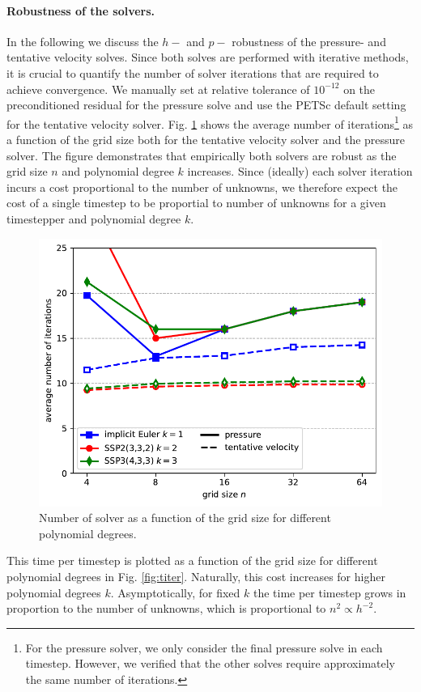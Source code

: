 \documentclass[11pt]{article}
\begin{document}
\paragraph{Robustness of the solvers.}
In the following we discuss the $h-$ and $p-$ robustness of the pressure- and tentative velocity solves. Since both solves are performed with iterative methods, it is crucial to quantify the number of solver iterations that are required to achieve convergence. We manually set at relative tolerance of $10^{-12}$ on the preconditioned residual for the pressure solve and use the PETSc default setting for the tentative velocity solver. Fig. \ref{fig:niter} shows the average number of iterations\footnote{For the pressure solver, we only consider the final pressure solve in each timestep. However, we verified that the other solves require approximately the same number of iterations.} as a function of the grid size both for the tentative velocity solver and the pressure solver. The figure demonstrates that empirically both solvers are robust as the grid size $n$ and polynomial degree $k$ increases. Since (ideally) each solver iteration incurs a cost proportional to the number of unknowns, we therefore expect the cost of a single timestep to be proportial to number of unknowns for a given timestepper and polynomial degree $k$.
\begin{figure}
    \begin{center}
        \includegraphics[width=0.75\linewidth]{figures/niter.pdf}
        \caption{Number of solver as a function of the grid size for different polynomial degrees.}
        \label{fig:niter}
    \end{center}
\end{figure}
This time per timestep is plotted as a function of the grid size for different polynomial degrees in Fig. \ref{fig:titer}. Naturally, this cost increases for higher polynomial degrees $k$. Asymptotically, for fixed $k$ the time per timestep grows in proportion to the number of unknowns, which is proportional to $n^2\propto h^{-2}$.
\end{document}
